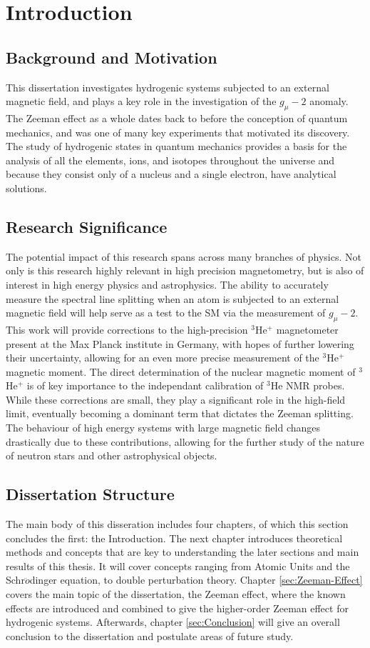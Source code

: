\chapter{Introduction}
    \section{Background and Motivation}
        This dissertation investigates hydrogenic systems subjected to an external magnetic field, and plays a key role in the investigation of the $g_\mu - 2$ anomaly. The Zeeman effect as a whole dates back to before the conception of quantum mechanics, and was one of many key experiments that motivated its discovery. The study of hydrogenic states in quantum mechanics provides a basis for the analysis of all the elements, ions, and isotopes throughout the universe and because they consist only of a nucleus and a single electron, have analytical solutions.
    \section{Research Significance}
        The potential impact of this research spans across many branches of physics. Not only is this research highly relevant in high precision magnetometry, but is also of interest in high energy physics and astrophysics. The ability to accurately measure the spectral line splitting when an atom is subjected to an external magnetic field will help serve as a test to the SM via the measurement of $g_\mu - 2$. This work will provide corrections to the high-precision $^3$He$^+$ magnetometer present at the Max Planck institute in Germany, with hopes of further lowering their uncertainty, allowing for an even more precise measurement of the $^3$He$^+$ magnetic moment. The direct determination of the nuclear magnetic moment of $^3$He$^+$ is of key importance to the independant calibration of $^3$He NMR probes. While these corrections are small, they play a significant role in the high-field limit, eventually becoming a dominant term that dictates the Zeeman splitting. The behaviour of high energy systems with large magnetic field changes drastically due to these contributions, allowing for the further study of the nature of neutron stars and other astrophysical objects.
    \section{Dissertation Structure}
        The main body of this disseration includes four chapters, of which this section concludes the first: the Introduction. The next chapter introduces theoretical methods and concepts that are key to understanding the later sections and main results of this thesis. It will cover concepts ranging from Atomic Units and the Schr$\ddot{o}$dinger equation, to double perturbation theory. Chapter \ref{sec:Zeeman-Effect} covers the main topic of the dissertation, the Zeeman effect, where the known effects are introduced and combined to give the higher-order Zeeman effect for hydrogenic systems. Afterwards, chapter \ref{sec:Conclusion} will give an overall conclusion to the dissertation and postulate areas of future study.\\


